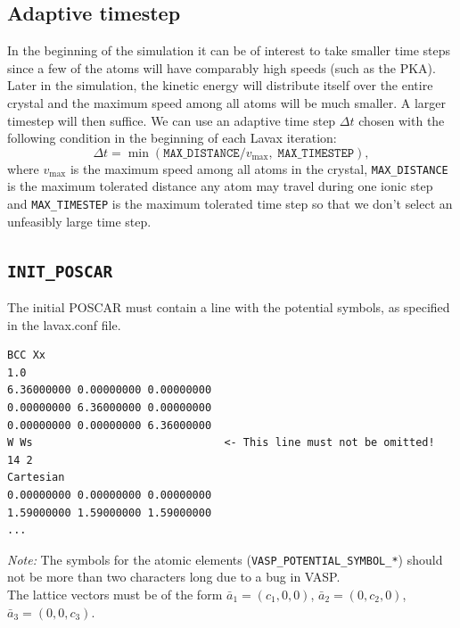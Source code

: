 \documentclass{article}
\begin{document}
\subsection{Adaptive timestep}
\label{sec:adaptive_timestep}
In the beginning of the simulation it can be of interest to take smaller time steps since a few of the atoms will have comparably high speeds (such as the PKA). Later in the simulation, the kinetic energy will distribute itself over the entire crystal and the maximum speed among all atoms will be much smaller.
A larger timestep will then suffice. We can use an adaptive time step $\Delta t$ chosen with the following condition in the beginning of each Lavax iteration:
\begin{equation*}
  \Delta t = \min{(\texttt{MAX\_DISTANCE}/v_{\text{max}},\; \texttt{MAX\_TIMESTEP})},
\end{equation*}
where $v_{\text{max}}$ is the maximum speed among all atoms in the crystal, \texttt{MAX\_DISTANCE} is the maximum tolerated distance any atom may travel during one ionic step and \texttt{MAX\_TIMESTEP} is the maximum tolerated time step so that we don't select an unfeasibly large time step.

\newpage
\subsection{\texttt{INIT\_POSCAR}}
The initial POSCAR must contain a line with the potential symbols, as specified in the lavax.conf file.
\begin{verbatim}
BCC Xx 
1.0
6.36000000 0.00000000 0.00000000
0.00000000 6.36000000 0.00000000
0.00000000 0.00000000 6.36000000
W Ws                              <- This line must not be omitted!
14 2
Cartesian
0.00000000 0.00000000 0.00000000
1.59000000 1.59000000 1.59000000
...
\end{verbatim}

\textit{Note: } The symbols for the atomic elements (\texttt{VASP\_POTENTIAL\_SYMBOL\_*}) should not be more than two characters long due to a bug in VASP.
\newline \\
The lattice vectors must be of the form $\bar{a}_1 = (c_1,0,0)$, $\bar{a}_2 = (0,c_2,0)$, $\bar{a}_3 = (0,0,c_3)$.

\newpage
\end{document}

